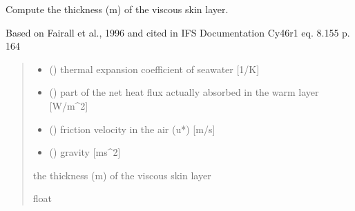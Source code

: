 \documentclass[letterpaper,10pt,english]{sphinxmanual}
\begin{document}
\begin{fulllineitems}
\label{\detokenize{users_guide:cs_wl_subs.delta}}
\pysigstartsignatures
{}
\pysigstopsignatures
\sphinxAtStartPar
Compute the thickness (m) of the viscous skin layer.

\sphinxAtStartPar
Based on Fairall et al., 1996 and cited in IFS Documentation Cy46r1
eq. 8.155 p. 164
\begin{quote}\begin{description}
\begin{itemize}
\item {} 
\sphinxAtStartPar
{} () \textendash{} thermal expansion coefficient of sea\sphinxhyphen{}water  {[}1/K{]}

\item {} 
\sphinxAtStartPar
{} () \textendash{} part of the net heat flux actually absorbed in the warm layer {[}W/m\textasciicircum{}2{]}

\item {} 
\sphinxAtStartPar
{} () \textendash{} friction velocity in the air (u*) {[}m/s{]}

\item {} 
\sphinxAtStartPar
{} () \textendash{} gravity                      {[}ms\textasciicircum{}\sphinxhyphen{}2{]}

\end{itemize}

\sphinxAtStartPar
{} \textendash{} the thickness (m) of the viscous skin layer

\sphinxAtStartPar
float

\end{description}\end{quote}

\end{fulllineitems}
\end{document}

